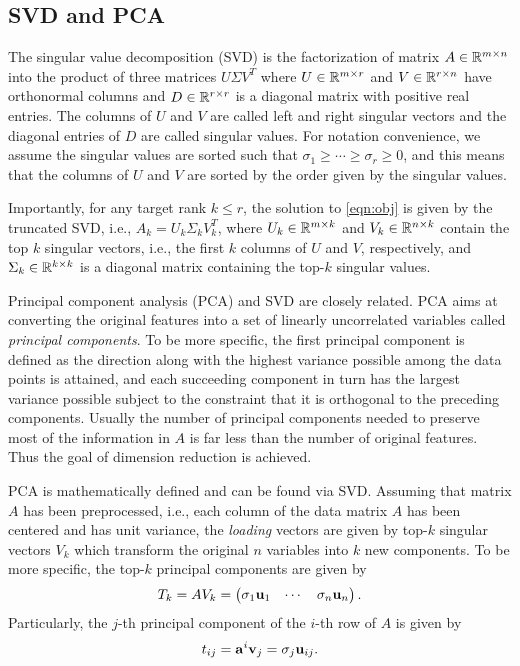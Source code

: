 \subsection{SVD and PCA}
The singular value decomposition (SVD) is the factorization of matrix $A \in \mathbb{R}^{m\times n}$ into the product of three matrices $U\Sigma V^T$ where $U \in \mathbb{R}^{m\times r}$ and $V\in \mathbb{R}^{r\times n}$ have orthonormal columns and $D\in \mathbb{R}^{r\times r}$ is a diagonal matrix with positive real entries. The columns of $U$ and $V$ are called left and right singular vectors and the diagonal entries of $D$ are called singular values. For notation convenience, we assume the singular values are sorted such that $\sigma_1\geq \cdots \geq \sigma_r\geq 0$, and
this means that the columns of $U$ and $V$ are sorted by the order given by the singular values.  

 
Importantly, for any target rank $k\leq r$, the solution to \eqref{eqn:obj} is given by the truncated SVD, i.e., $A_k = U_k \Sigma_k V_k^T$, where $U_k \in \mathbb{R}^{m\times k}$ and $V_k\in \mathbb{R}^{n\times k}$ contain the top $k$ singular vectors, i.e., the first $k$ columns of $U$ and $V$, respectively, and $\Sigma_k\in \mathbb{R}^{k\times k}$ is a diagonal matrix containing the top-$k$ singular values.

Principal component analysis (PCA) and SVD are closely related.
PCA aims at converting the original features into a set of linearly uncorrelated variables called {\it principal components}.
To be more specific, the first principal component is defined as the direction along with the highest variance possible among the data points is attained, and each succeeding component in turn has the largest variance possible subject to the constraint that it is orthogonal to the preceding components.
Usually the number of principal components needed to preserve most of the information in $A$ is far less than the number of original features. Thus the goal of dimension reduction is achieved.

PCA is mathematically defined and can be found via SVD.
Assuming that matrix $A$ has been preprocessed, i.e., each column of the data matrix $A$ has been centered and has unit variance, the {\it loading} vectors are given by top-$k$ singular vectors $V_k$ which transform the original $n$ variables into $k$ new components. To be more specific, the top-$k$ principal components are given by 
\begin{equation}
  T_k = A V_k = \begin{pmatrix} \sigma_1 \mathbf{u}_1 & \cdots & \sigma_n \mathbf{u}_n \end{pmatrix}.
\end{equation}
Particularly, the $j$-th principal component of the $i$-th row of $A$ is given by 
\begin{equation}
  t_{ij} = \mathbf{a}^i \mathbf{v}_j = \sigma_j \mathbf{u}_{ij}.
\end{equation}

